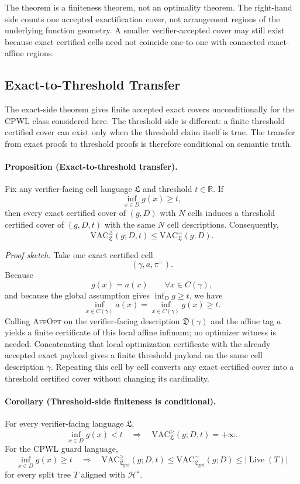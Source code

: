 \documentclass{article}
\begin{document}
The theorem is a finiteness theorem, not an optimality theorem. The right-hand side counts one accepted exactification cover, not arrangement regions of the underlying function geometry. A smaller verifier-accepted cover may still exist because exact certified cells need not coincide one-to-one with connected exact-affine regions.

\subsection{Exact-to-Threshold Transfer}

The exact-side theorem gives finite accepted exact covers unconditionally for the CPWL class considered here. The threshold side is different: a finite threshold certified cover can exist only when the threshold claim itself is true. The transfer from exact proofs to threshold proofs is therefore conditional on semantic truth.

\paragraph{Proposition (Exact-to-threshold transfer).}
Fix any verifier-facing cell language $\mathfrak L$ and threshold $t\in\mathbb R$. If
\[
\inf_{x\in D} g(x)\ge t,
\]
then every exact certified cover of $(g,D)$ with $N$ cells induces a threshold certified cover of $(g,D,t)$ with the same $N$ cell descriptions. Consequently,
\[
\mathrm{VAC}^{\ge}_{\mathfrak L}(g;D,t)
\le
\mathrm{VAC}^{=}_{\mathfrak L}(g;D).
\]

\smallskip
\noindent\emph{Proof sketch.}
Take one exact certified cell
\[
(\gamma,a,\pi^{=}).
\]
Because
\[
g(x)=a(x)\qquad \forall x\in C(\gamma),
\]
and because the global assumption gives $\inf_D g\ge t$, we have
\[
\inf_{x\in C(\gamma)} a(x)
=
\inf_{x\in C(\gamma)} g(x)
\ge t.
\]
Calling \textsc{AffOpt} on the verifier-facing description $\mathfrak D(\gamma)$ and the affine tag $a$ yields a finite certificate of this local affine infimum; no optimizer witness is needed. Concatenating that local optimization certificate with the already accepted exact payload gives a finite threshold payload on the same cell description $\gamma$. Repeating this cell by cell converts any exact certified cover into a threshold certified cover without changing its cardinality.

\paragraph{Corollary (Threshold-side finiteness is conditional).}
For every verifier-facing language $\mathfrak L$,
\[
\inf_{x\in D} g(x)<t
\quad\Longrightarrow\quad
\mathrm{VAC}^{\ge}_{\mathfrak L}(g;D,t)=+\infty.
\]
For the CPWL guard language,
\[
\inf_{x\in D} g(x)\ge t
\quad\Longrightarrow\quad
\mathrm{VAC}^{\ge}_{\mathfrak L_{\mathrm{grd}}}(g;D,t)
\le
\mathrm{VAC}^{=}_{\mathfrak L_{\mathrm{grd}}}(g;D)
\le
|\operatorname{Live}(T)|
\]
for every split tree $T$ aligned with $\mathcal H^\star$.
\end{document}
